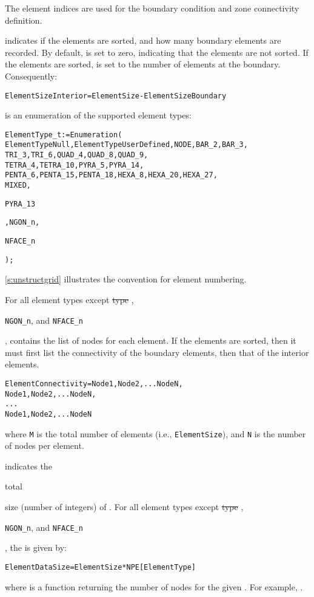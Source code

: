 The element indices are used for the boundary condition and zone
connectivity definition.

 indicates if the elements are sorted, and
how many boundary elements are recorded.
By default,  is set to zero, indicating that
the elements are not sorted.
If the elements are sorted,  is set to the
number of elements at the boundary.
Consequently:
\begin{alltt}
  ElementSizeInterior = ElementSize - ElementSizeBoundary
\end{alltt}

 is an enumeration of the supported element types:
\begin{alltt}
  ElementType\_t := Enumeration(
     ElementTypeNull, ElementTypeUserDefined, NODE, BAR\_2, BAR\_3,
     TRI\_3, TRI\_6, QUAD\_4, QUAD\_8, QUAD\_9,
     TETRA\_4, TETRA\_10, PYRA\_5, PYRA\_14,
     PENTA\_6, PENTA\_15, PENTA\_18, HEXA\_8, HEXA\_20, HEXA\_27,
     MIXED, \begin{changes}PYRA\_13\end{changes}, NGON\_n, \begin{changes}NFACE\_n\end{changes} );
\end{alltt}
\autoref{s:unstructgrid} illustrates the convention for element numbering.

For all element types except \sout{type} , \begin{changes}\texttt{NGON\_n},
and \texttt{NFACE\_n}\end{changes}, 
contains the list of nodes for each element.
If the elements are sorted, then it must first list the connectivity of
the boundary elements, then that of the interior elements.
\begin{alltt}
  ElementConnectivity = Node1, Node2, ... NodeN,
                        Node1, Node2, ... NodeN,
                        ...
                        Node1, Node2, ... NodeN
\end{alltt}
\begin{changes}where \texttt{M} is the total number of elements (i.e.,
\texttt{ElementSize}), and \texttt{N} is the number of nodes per
element.\end{changes}

 indicates the \begin{changes}total\end{changes} size (number of integers) of
.
For all element types except \sout{type} , \begin{changes}\texttt{NGON\_n},
and \texttt{NFACE\_n}\end{changes}, the 
is given by:
\begin{alltt}
  ElementDataSize = ElementSize * NPE[ElementType]
\end{alltt}
where  is a function returning the number of
nodes for the given .
For example, .

